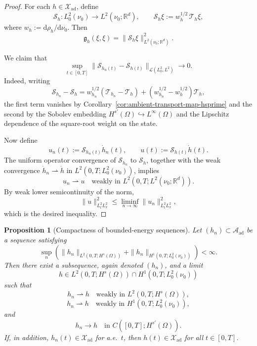 \documentclass{article}
\newtheorem{proposition}[theorem]{Proposition}
\theoremstyle{definition}
\renewcommand{\d}{\mathrm{d}}
\begin{document}
\begin{proof}
    For each \(h\in\mathcal X_{\mathrm{ad}}\), define
    \[
        \mathcal S_h : L^2_0(\nu_0)\to L^2(\nu_0;\mathbb R^d),
        \qquad
        \mathcal S_h \xi := w_h^{1/2}\,\mathcal T_h\xi,
    \]
    where \(w_h:=\d\rho_h/\d\nu_0\). Then
    \[
        \mathfrak g_h(\xi,\xi)
        =
        \|\mathcal S_h \xi\|_{L^2(\nu_0;\mathbb R^d)}^2.
    \]

    We claim that
    \[
        \sup_{t\in[0,T]}
        \|\mathcal S_{h_n(t)}-\mathcal S_{h(t)}\|_{\mathcal L(L^2_0,L^2)}
        \to 0.
    \]
    Indeed, writing
    \[
        \mathcal S_{h_n}-\mathcal S_h
        =
        w_{h_n}^{1/2}(\mathcal T_{h_n}-\mathcal T_h)
        +
        (w_{h_n}^{1/2}-w_h^{1/2})\mathcal T_h,
    \]
    the first term vanishes by Corollary~\ref{cor:ambient-transport-map-hsprime} and the second
    by the Sobolev embedding \(H^{s'}(\Omega)\hookrightarrow L^\infty(\Omega)\) and the Lipschitz
    dependence of the square-root weight on the state.

    Now define
    \[
        u_n(t):=\mathcal S_{h_n(t)}\dot h_n(t),
        \qquad
        u(t):=\mathcal S_{h(t)}\dot h(t).
    \]
    The uniform operator convergence of \(\mathcal S_{h_n}\) to \(\mathcal S_h\), together with the
    weak convergence \(\dot h_n\rightharpoonup \dot h\) in \(L^2(0,T;L^2_0(\nu_0))\), implies
    \[
        u_n\rightharpoonup u
        \quad\text{weakly in } L^2(0,T;L^2(\nu_0;\mathbb R^d)).
    \]
    By weak lower semicontinuity of the norm,
    \[
        \|u\|_{L^2_tL^2_x}^2
        \le
        \liminf_{n\to\infty}
        \|u_n\|_{L^2_tL^2_x}^2,
    \]
    which is the desired inequality.
\end{proof}

\begin{proposition}[Compactness of bounded-energy sequences]
    \label{prop:ambient-compactness}
    Let \((h_n)\subset \mathcal A_{\mathrm{ad}}\) be a sequence satisfying
    \[
        \sup_n
        \left(
        \|h_n\|_{L^2(0,T;H^s(\Omega))}
        +
        \|h_n\|_{H^1(0,T;L^2_0(\nu_0))}
        \right)
        <\infty.
    \]
    Then there exist a subsequence, again denoted \((h_n)\), and a limit
    \[
        h\in L^2(0,T;H^s(\Omega))\cap H^1(0,T;L^2_0(\nu_0))
    \]
    such that
    \[
        h_n \rightharpoonup h
        \quad\text{weakly in } L^2(0,T;H^s(\Omega)),
    \]
    \[
        h_n \rightharpoonup h
        \quad\text{weakly in } H^1(0,T;L^2_0(\nu_0)),
    \]
    and
    \[
        h_n\to h
        \quad\text{in } C([0,T];H^{s'}(\Omega)).
    \]
    If, in addition, \(h_n(t)\in \mathcal X_{\mathrm{ad}}\) for a.e.\ \(t\), then
    \(h(t)\in \mathcal X_{\mathrm{ad}}\) for all \(t\in[0,T]\).
\end{proposition}
\end{document}
